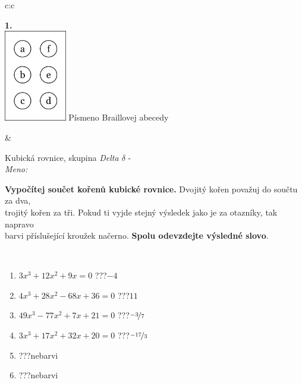 \documentclass[10pt]{report}
\begin{document}
\begin{tabular}{c:c}
\begin{minipage}[c][104.5mm][t]{0.5\linewidth}
\begin{center}
\begin{minipage}{0.20\linewidth}
\begin{center}
{\Huge\bfseries 1.} \\[2mm]
\includegraphics[height=40mm]{../images/braille.png}
{\small Písmeno Braillovej abecedy}
\end{center}
\end{minipage}
\end{center}
\end{minipage}
&
\begin{minipage}[c][104.5mm][t]{0.5\linewidth}
\begin{center}
\vspace{7mm}
{\huge Kubická rovnice, skupina \textit{Delta $\delta$} -}\\[5mm]
\textit{Meno:}\phantom{xxxxxxxxxxxxxxxxxxxxxxxxxxxxxxxxxxxxxxxxxxxxxxxxxxxxxxxxxxxxxxxxx}\\[5mm]
\begin{minipage}{0.95\linewidth}
\textbf{Vypočítej součet kořenů kubické rovnice.} Dvojitý kořen považuj do součtu za dva,\\trojitý kořen za tři. Pokud ti vyjde stejný výsledek jako je za otazníky, tak napravo\\barvi příslušející kroužek načerno. \textbf{Spolu odevzdejte výsledné slovo}.
\end{minipage}
\\[1mm]
\begin{minipage}{0.79\linewidth}
\begin{center}
\begin{varwidth}{\linewidth}
\begin{enumerate}
\Large
\item $3x^3+12x^2+9x=0$\quad \dotfill\; ???\;\dotfill \quad $-4$
\item $4x^3+28x^2-68x+36=0$\quad \dotfill\; ???\;\dotfill \quad $11$
\item $49x^3-77x^2+7x+21=0$\quad \dotfill\; ???\;\dotfill \quad $\nicefrac{-3}{7}$
\item $3x^3+17x^2+32x+20=0$\quad \dotfill\; ???\;\dotfill \quad $\nicefrac{-17}{3}$
\item \quad \dotfill\; ???\;\dotfill \quad nebarvi
\item \quad \dotfill\; ???\;\dotfill \quad nebarvi

\end{enumerate}
\end{varwidth}
\end{center}
\end{minipage}
\end{center}
\end{minipage}
\end{tabular}
\end{document}
